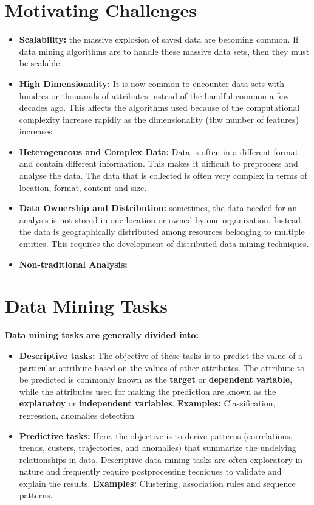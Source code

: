 \clearpage
\section{Motivating Challenges}

	\begin{itemize}
		\item {\bf Scalability:} the massive explosion of saved data are becoming common. If data mining 
		algorithms are to handle these massive data sets, then they must be scalable.
		\item {\bf High Dimensionality:} It is now common to encounter data sets with hundres or thousands 
		of attributes instead of the handful common a few decades ago. This affects the algorithms used 
		because of the computational complexity increase rapidly as the dimensionality (thw number of 
		features) increases.
		\item {\bf Heterogeneous and Complex Data:} Data is often in a different format and contain different
		information. This makes it difficult to preprocess and analyse the data. The data that is collected is
		often very complex in terms of location, format, content and size. 
		\item {\bf Data Ownership and Distribution:} sometimes, the data needed for an analysis is not 
		stored in one location or owned by one organization. Instead, the data is geographically distributed 
		among resources belonging to multiple entities. This requires the development of distributed
		data mining techniques. 
		\item {\bf Non-traditional Analysis:} 
	\end{itemize}

\clearpage
\section{Data Mining Tasks}
	
	{\bf Data mining tasks are generally divided into:}

	\begin{itemize}
		\item {\bf Descriptive tasks:} The objective of these tasks is to predict 
		the value of a particular attribute based on the values of other attributes. 
		The attribute to be predicted is commonly known as the {\bf target} or 
		{\bf dependent variable}, while the attributes used for making the prediction are 
		known as the {\bf explanatoy} or {\bf independent variables}. 
		{\bf Examples: }{\color{blue} Classification, regression, anomalies detection} 
		\item {\bf Predictive tasks:} Here, the objective is to derive patterns 
		(correlations, trends, custers, trajectories, and anomalies) that summarize the undelying relationships in data. Descriptive data mining tasks are often exploratory in nature 
		and frequently require postprocessing tecniques to validate and explain the results. 
		{\bf Examples:} {\color{blue}Clustering, association rules and sequence patterns.}
	\end{itemize}

